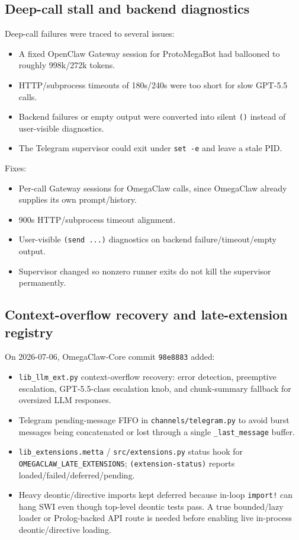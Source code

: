 \documentclass[11pt]{article}
\begin{document}
\subsection{Deep-call stall and backend diagnostics}

Deep-call failures were traced to several issues:
\begin{itemize}
  \item A fixed OpenClaw Gateway session for ProtoMegaBot had ballooned to roughly 998k/272k tokens.
  \item HTTP/subprocess timeouts of 180s/240s were too short for slow GPT-5.5 calls.
  \item Backend failures or empty output were converted into silent \texttt{()} instead of user-visible diagnostics.
  \item The Telegram supervisor could exit under \texttt{set -e} and leave a stale PID.
\end{itemize}

Fixes:
\begin{itemize}
  \item Per-call Gateway sessions for OmegaClaw calls, since OmegaClaw already supplies its own prompt/history.
  \item 900s HTTP/subprocess timeout alignment.
  \item User-visible \texttt{(send ...)} diagnostics on backend failure/timeout/empty output.
  \item Supervisor changed so nonzero runner exits do not kill the supervisor permanently.
\end{itemize}

\subsection{Context-overflow recovery and late-extension registry}

On 2026-07-06, OmegaClaw-Core commit \texttt{98e8883} added:
\begin{itemize}
  \item \texttt{lib\_llm\_ext.py} context-overflow recovery: error detection, preemptive escalation, GPT-5.5-class escalation knob, and chunk-summary fallback for oversized LLM responses.
  \item Telegram pending-message FIFO in \texttt{channels/telegram.py} to avoid burst messages being concatenated or lost through a single \texttt{\_last\_message} buffer.
  \item \texttt{lib\_extensions.metta} / \texttt{src/extensions.py} status hook for \texttt{OMEGACLAW\_LATE\_EXTENSIONS}; \texttt{(extension-status)} reports loaded/failed/deferred/pending.
  \item Heavy deontic/directive imports kept deferred because in-loop \texttt{import!} can hang SWI even though top-level deontic tests pass.  A true bounded/lazy loader or Prolog-backed API route is needed before enabling live in-process deontic/directive loading.
\end{itemize}
\end{document}
